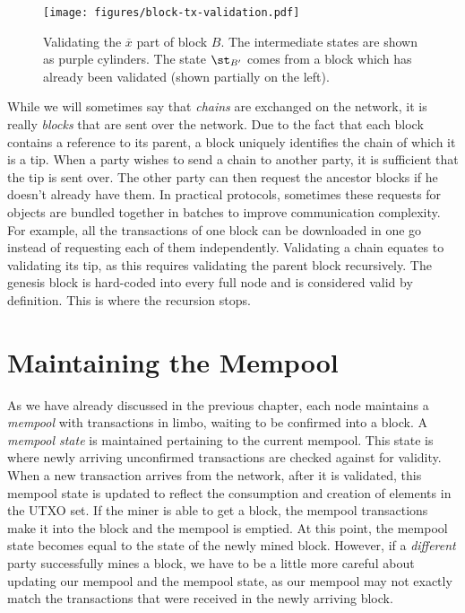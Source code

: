 \begin{figure}[h]
    \centering
    \texttt{[image: figures/block-tx-validation.pdf]}
    \caption{Validating the $\overline{x}$ part of block $B$. The intermediate states
             are shown as purple cylinders. The state $\st_{B'}$ comes from a block
             which has already been validated (shown partially on the left).}
    \label{fig.block-tx-validation}
\end{figure}

While we will sometimes say that \emph{chains} are exchanged on the network, it is really
\emph{blocks} that are sent over the network. Due to the fact that each block contains
a reference to its parent, a block uniquely identifies the chain of which it is a tip.
When a party wishes to send a chain to another party, it is sufficient that the tip is
sent over. The other party can then request the ancestor blocks if he doesn't already
have them.
In practical protocols, sometimes these requests for objects are bundled
together in batches to improve communication complexity. For example, all the transactions
of one block can be downloaded in one go instead of requesting each of them independently.
Validating a chain equates to validating its tip, as this requires validating
the parent block recursively. The genesis block is hard-coded into every full node and is
considered valid by definition. This is where the recursion stops.

\section{Maintaining the Mempool}

As we have already discussed in the previous chapter, each node maintains a \emph{mempool}
with transactions in limbo, waiting to be confirmed into a block. A \emph{mempool state}
is maintained pertaining to the current mempool. This state is where newly arriving unconfirmed
transactions are checked against for validity. When a new transaction arrives from the network,
after it is validated, this mempool state is updated to reflect the consumption and creation
of elements in the UTXO set. If the miner is able to
get a block, the mempool transactions make it into the block and the mempool is emptied.
At this point, the mempool state becomes equal to the state of the newly mined block.
However, if a \emph{different} party successfully mines a block, we have to be a little
more careful about updating our mempool and the mempool state, as our mempool may not exactly
match the transactions that were received in the newly arriving block.


